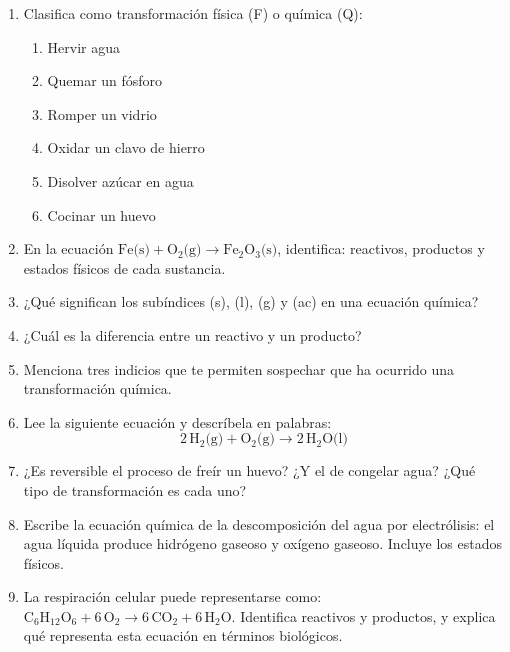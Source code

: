 \documentclass[12pt, letterpaper]{article}
\begin{document}
\begin{enumerate}[leftmargin=*, resume]
  \item \facil{} Clasifica como transformación física (F) o química (Q):
        \begin{enumerate}[label=\alph*)]
          \item Hervir agua
          \item Quemar un fósforo
          \item Romper un vidrio
          \item Oxidar un clavo de hierro
          \item Disolver azúcar en agua
          \item Cocinar un huevo
        \end{enumerate}

  \item \facil{} En la ecuación $\text{Fe(s)} + \text{O}_2\text{(g)} \rightarrow \text{Fe}_2\text{O}_3\text{(s)}$, identifica: reactivos, productos y estados físicos de cada sustancia.

  \item \facil{} ¿Qué significan los subíndices (s), (l), (g) y (ac) en una ecuación química?

  \item \facil{} ¿Cuál es la diferencia entre un reactivo y un producto?

  \item \medio{} Menciona tres indicios que te permiten sospechar que ha ocurrido una transformación química.

  \item \medio{} Lee la siguiente ecuación y descríbela en palabras:
        $$2\,\text{H}_2\text{(g)} + \text{O}_2\text{(g)} \rightarrow 2\,\text{H}_2\text{O(l)}$$

  \item \medio{} ¿Es reversible el proceso de freír un huevo? ¿Y el de congelar agua? ¿Qué tipo de transformación es cada uno?

  \item \medio{} Escribe la ecuación química de la descomposición del agua por electrólisis: el agua líquida produce hidrógeno gaseoso y oxígeno gaseoso. Incluye los estados físicos.

  \item \dificil{} La respiración celular puede representarse como: $\text{C}_6\text{H}_{12}\text{O}_6 + 6\,\text{O}_2 \rightarrow 6\,\text{CO}_2 + 6\,\text{H}_2\text{O}$. Identifica reactivos y productos, y explica qué representa esta ecuación en términos biológicos.


\end{enumerate}
\end{document}

